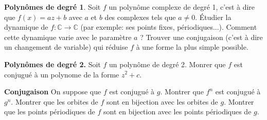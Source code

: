 \documentclass{article}
\begin{document}
\textbf{Polynômes de degré 1}.
Soit $ f $ un polynôme complexe de degré 1,
c'est à dire que
$ f(x) = az + b $
avec $ a $ et $ b $
des complexes tels que
$ a \neq 0 $.
Étudier la dynamique
de
$ f : \mathbb{C} \to \mathbb{C} $
(par exemple: ses points fixes, périodiques...).
Comment cette dynamique varie avec le paramètre
$ a $ ?
Trouver une conjugaison
(c'est à dire un changement de variable)
qui réduise $ f $ à une forme la plus simple
possible.

\textbf{Polynômes de degré 2.}
Soit $ f $
un polynôme de degré 2.
Monrer que $ f $
est conjugué à un polynome
de la forme
$ z^2 + c $.

\textbf{Conjugaison}
On suppose
que $ f $
est conjugué à
$ g $.
Montrer que $ f^n $
est conjugué à
$ g^{n} $.
Montrer que les orbites
de $ f $
sont en bijection
avec les orbites de $ g $.
Montrer que les points périodiques
de $ f $
sont en bijection
avec les points périodiques de $ g $.

\end{document}
